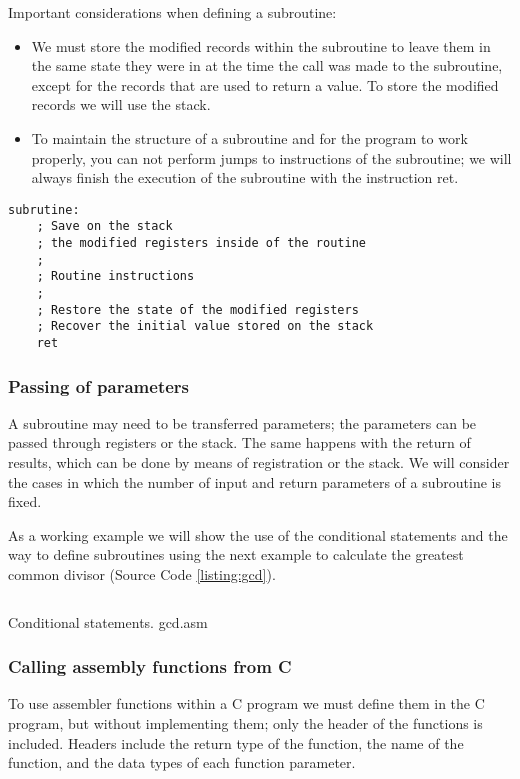 Important considerations when defining a subroutine:
\begin{itemize}
\item We must store the modified records within the subroutine to leave them in the same state they were in at the time the call was made to the subroutine, except for the records that are used to return a value. To store the modified records we will use the stack.
\item To maintain the structure of a subroutine and for the program to work properly, you can not perform jumps to instructions of the subroutine; we will always finish the execution of the subroutine with the instruction ret.
\end{itemize}
\begin{verbatim}
subrutine:
	; Save on the stack
	; the modified registers inside of the routine
	;
	; Routine instructions
	;
	; Restore the state of the modified registers
	; Recover the initial value stored on the stack
	ret
\end{verbatim}

\subsubsection{Passing of parameters}
A subroutine may need to be transferred parameters; the parameters can be passed through registers or the stack. The same happens with the return of results, which can be done by means of registration or the stack. We will consider the cases in which the number of input and return parameters of a subroutine is fixed.

As a working example we will show the use of the conditional statements and the way to define subroutines using the next example to calculate the greatest common divisor (Source Code \ref{listing:gcd}).

\newpage
\begin{listing}[H]
\inputminted{nasm}{code/gcd.asm}
\caption{Conditional statements. gcd.asm}
\label{listing:gcd}
\end{listing}
\newpage

\subsubsection{Calling assembly functions from C}
To use assembler functions within a C program we must define them in the C program, but without implementing them; only the header of the functions is included. Headers include the return type of the function, the name of the function, and the data types of each function parameter.

